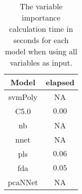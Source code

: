 \begin{table}[!ht]
	\centering
	\begin{tabular}{|c|c|}
		\hline
		Model & elapsed \\ \hline
		svmPoly & NA \\ \hline
		C5.0 & $0.00$ \\ \hline
		nb & NA \\ \hline
		nnet & NA \\ \hline
		pls & $0.06$ \\ \hline
		fda & $0.05$ \\ \hline
		pcaNNet & NA \\ \hline
	\end{tabular}
	\caption{The variable importance calculation time in seconds for each model when using all variables as input.}
	\label{tab:time:all:importance}
\end{table}
